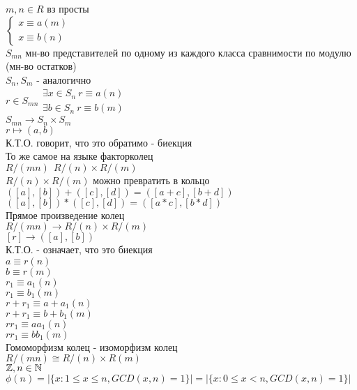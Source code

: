 $ m,n \in R $ вз просты \\
$ \left\{ \begin{array}{cc}
x \equiv a (m) \\
x \equiv b (n) 
\end{array} \right. $ \\
$ S_{mn} $ мн-во представителей по одному из каждого класса сравнимости по модулю (мн-во остатков) \\
$ S_n, S_m $ - аналогично \\
$ r \in S_{mn} \begin{array}{cc}
\exists x \in S_n \ r \equiv a (n) \\
\exists b \in S_n \ r \equiv b (m) 
\end{array} $ \\
$ S_{mn} \rightarrow S_n \times S_m $ \\
$ r \mapsto (a, b) $ \\
К.Т.О. говорит, что это обратимо - биекция \\
То же самое на языке факторколец \\
$ R / (mn) \ \ R / (n) \times R / (m) $ \\
$ R / (n) \times R / (m) $ можно превратить в кольцо \\
$ ([a],  [b]) + ([c], [d]) = ([a+c], [b+d]) $ \\
$ ([a],  [b]) * ([c], [d]) = ([a*c], [b*d]) $ \\
Прямое произведение колец \\
$ R / (mn) \rightarrow R / (n) \times R / (m) $ \\
$ [r] \rightarrow ([a], [b]) $\\
К.Т.О. - означает, что это биекция \\
$ a \equiv r(n) $ \\
$ b \equiv r(m) $ \\
$ r_1 \equiv a_1(n) $ \\
$ r_1 \equiv b_1(m) $ \\
$ r + r_1 \equiv a + a_1 (n) $ \\
$ r + r_1 \equiv b + b_1 (m) $ \\
$ r r_1 \equiv aa_1 (n) $ \\
$ r r_1 \equiv bb_1(m) $ \\
Гомоморфизм колец - изоморфизм колец \\
$ R /(mn) \cong R /(n) \times R(m) $ \\
$ \mathbb{Z}, n \in \mathbb{N} $ \\
$ \phi(n) = |\{ x : 1 \leq x \leq n, GCD(x, n) = 1 \} | = |\{ x : 0 \leq x < n, GCD(x, n) = 1 \} | $ \\
